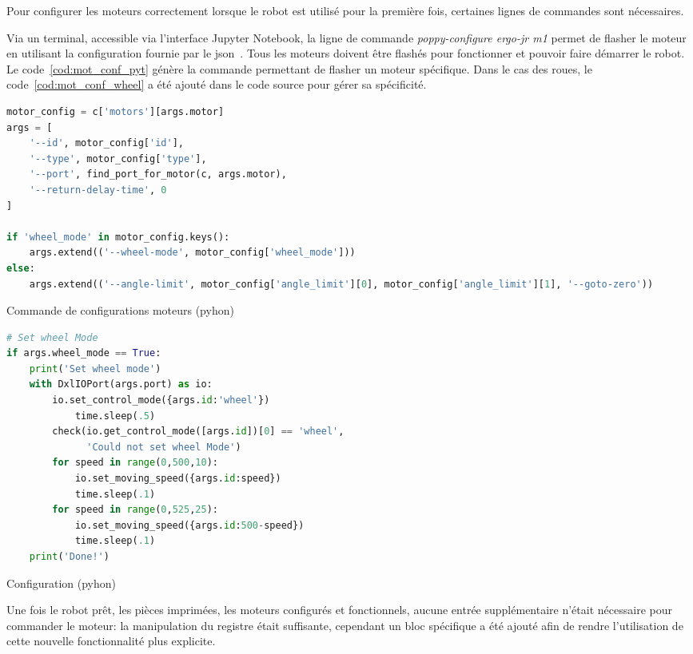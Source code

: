             Pour configurer les moteurs correctement lorsque le robot est utilisé pour la première fois, certaines lignes de commandes sont nécessaires.\par%
            Via un terminal, accessible via l’interface Jupyter Notebook, la ligne de commande \textit{poppy-configure ergo-jr m1} permet de flasher le moteur  en utilisant la configuration fournie par le json~.
            Tous les moteurs doivent être flashés pour fonctionner et pouvoir faire démarrer le robot. Le code~\ref{cod:mot_conf_pyt} génère la commande permettant de flasher un moteur spécifique. Dans le cas des roues, le code~\ref{cod:mot_conf_wheel} a été ajouté dans le code source pour gérer sa spécificité.
            \begin{code}
                \begin{lstlisting}[language=Python]
motor_config = c['motors'][args.motor]
args = [
    '--id', motor_config['id'],
    '--type', motor_config['type'],
    '--port', find_port_for_motor(c, args.motor),
    '--return-delay-time', 0
]

if 'wheel_mode' in motor_config.keys():
    args.extend(('--wheel-mode', motor_config['wheel_mode']))
else:
    args.extend(('--angle-limit', motor_config['angle_limit'][0], motor_config['angle_limit'][1], '--goto-zero'))
                \end{lstlisting}
                \caption{\label{cod:mot_conf_pyt}Commande de configurations moteurs (pyhon)}
            \end{code}\par%
            \begin{code}
            \begin{lstlisting}[language=Python]
# Set wheel Mode
if args.wheel_mode == True:
    print('Set wheel mode')
    with DxlIOPort(args.port) as io:
        io.set_control_mode({args.id:'wheel'})
            time.sleep(.5)
        check(io.get_control_mode([args.id])[0] == 'wheel',
              'Could not set wheel Mode')
        for speed in range(0,500,10):
            io.set_moving_speed({args.id:speed})
            time.sleep(.1)
        for speed in range(0,525,25):
            io.set_moving_speed({args.id:500-speed})
            time.sleep(.1)
    print('Done!')
            \end{lstlisting}
            \caption{\label{cod:mot_conf_wheel}Configuration  (pyhon)}
            \end{code}\par%
            Une fois le robot prêt, les pièces imprimées, les moteurs configurés et fonctionnels, aucune entrée supplémentaire n'était nécessaire pour commander le moteur: la manipulation du registre  était suffisante, cependant un bloc  spécifique a été ajouté afin de rendre l'utilisation de cette nouvelle fonctionnalité plus explicite.
